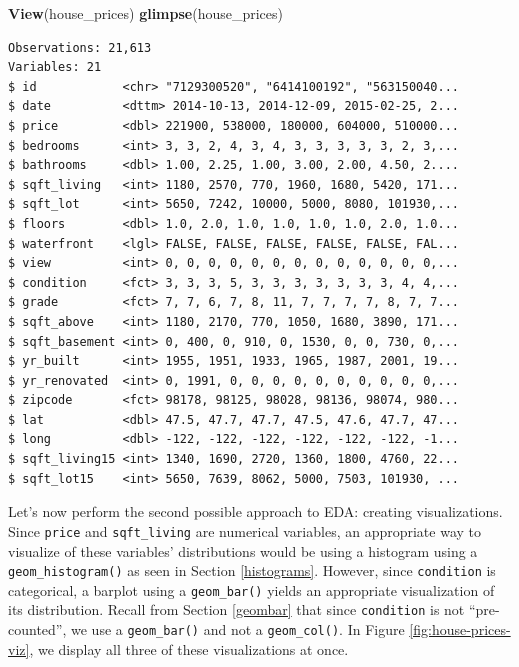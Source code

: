 \documentclass[12pt,]{krantz}
\makeatletter
\newenvironment{Shaded}{\begin{snugshade}}{\end{snugshade}}
\newcommand{\KeywordTok}[1]{\textcolor[rgb]{0.27,0.27,0.27}{\textbf{#1}}}
\newcommand{\NormalTok}[1]{#1}
\newenvironment{kframe}{%
\medskip{}
\setlength{\fboxsep}{.8em}
 \def\at@end@of@kframe{}%
 \ifinner\ifhmode%
  \def\at@end@of@kframe{\end{minipage}}%
  \begin{minipage}{\columnwidth}%
 \fi\fi%
 \def\FrameCommand##1{\hskip\@totalleftmargin \hskip-\fboxsep
 \colorbox{shadecolor}{##1}\hskip-\fboxsep
     \hskip-\linewidth \hskip-\@totalleftmargin \hskip\columnwidth}%
 \MakeFramed {\advance\hsize-\width
   \@totalleftmargin\z@ \linewidth\hsize
   \@setminipage}}%
 {\par\unskip\endMakeFramed%
 \at@end@of@kframe}
\renewenvironment{Shaded}{\begin{kframe}}{\end{kframe}}
\makeatother
\begin{document}
\begin{Shaded}
\begin{Highlighting}[]
\KeywordTok{View}\NormalTok{(house_prices)}
\KeywordTok{glimpse}\NormalTok{(house_prices)}
\end{Highlighting}
\end{Shaded}

\begin{verbatim}
Observations: 21,613
Variables: 21
$ id            <chr> "7129300520", "6414100192", "563150040...
$ date          <dttm> 2014-10-13, 2014-12-09, 2015-02-25, 2...
$ price         <dbl> 221900, 538000, 180000, 604000, 510000...
$ bedrooms      <int> 3, 3, 2, 4, 3, 4, 3, 3, 3, 3, 3, 2, 3,...
$ bathrooms     <dbl> 1.00, 2.25, 1.00, 3.00, 2.00, 4.50, 2....
$ sqft_living   <int> 1180, 2570, 770, 1960, 1680, 5420, 171...
$ sqft_lot      <int> 5650, 7242, 10000, 5000, 8080, 101930,...
$ floors        <dbl> 1.0, 2.0, 1.0, 1.0, 1.0, 1.0, 2.0, 1.0...
$ waterfront    <lgl> FALSE, FALSE, FALSE, FALSE, FALSE, FAL...
$ view          <int> 0, 0, 0, 0, 0, 0, 0, 0, 0, 0, 0, 0, 0,...
$ condition     <fct> 3, 3, 3, 5, 3, 3, 3, 3, 3, 3, 3, 4, 4,...
$ grade         <fct> 7, 7, 6, 7, 8, 11, 7, 7, 7, 7, 8, 7, 7...
$ sqft_above    <int> 1180, 2170, 770, 1050, 1680, 3890, 171...
$ sqft_basement <int> 0, 400, 0, 910, 0, 1530, 0, 0, 730, 0,...
$ yr_built      <int> 1955, 1951, 1933, 1965, 1987, 2001, 19...
$ yr_renovated  <int> 0, 1991, 0, 0, 0, 0, 0, 0, 0, 0, 0, 0,...
$ zipcode       <fct> 98178, 98125, 98028, 98136, 98074, 980...
$ lat           <dbl> 47.5, 47.7, 47.7, 47.5, 47.6, 47.7, 47...
$ long          <dbl> -122, -122, -122, -122, -122, -122, -1...
$ sqft_living15 <int> 1340, 1690, 2720, 1360, 1800, 4760, 22...
$ sqft_lot15    <int> 5650, 7639, 8062, 5000, 7503, 101930, ...
\end{verbatim}

Let's now perform the second possible approach to EDA: creating
visualizations. Since \texttt{price} and \texttt{sqft\_living} are
numerical variables, an appropriate way to visualize of these variables'
distributions would be using a histogram using a
\texttt{geom\_histogram()} as seen in Section \ref{histograms}. However,
since \texttt{condition} is categorical, a barplot using a
\texttt{geom\_bar()} yields an appropriate visualization of its
distribution. Recall from Section \ref{geombar} that since
\texttt{condition} is not ``pre-counted'', we use a \texttt{geom\_bar()}
and not a \texttt{geom\_col()}. In Figure \ref{fig:house-prices-viz}, we
display all three of these visualizations at once.
\end{document}
